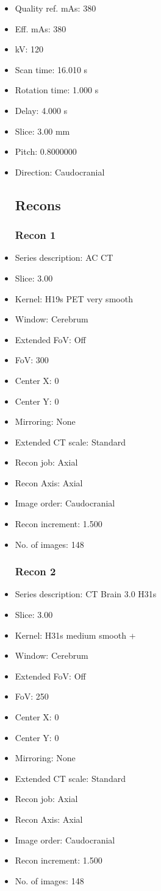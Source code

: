 \documentclass[12pt]{article}
\begin{document}
\begin{itemize}
\subsection{Scan}
\item Quality ref. mAs: 380\item Eff. mAs: 380\item kV: 120\item Scan time: 16.010 s\item Rotation time: 1.000 s\item Delay: 4.000 s\item Slice: 3.00 mm\item Pitch: 0.8000000\item Direction: Caudocranial\subsection{Recons}

\subsubsection{Recon 1}
\item Series description: AC CT
\item Slice: 3.00
\item Kernel: H19s PET very smooth
\item Window: Cerebrum
\item Extended FoV: Off
\item FoV: 300
\item Center X: 0
\item Center Y: 0
\item Mirroring: None
\item Extended CT scale: Standard
\item Recon job: Axial
\item Recon Axis: Axial
\item Image order: Caudocranial
\item Recon increment: 1.500
\item No. of images: 148
\subsubsection{Recon 2}
\item Series description: CT Brain 3.0 H31s
\item Slice: 3.00
\item Kernel: H31s medium smooth +
\item Window: Cerebrum
\item Extended FoV: Off
\item FoV: 250
\item Center X: 0
\item Center Y: 0
\item Mirroring: None
\item Extended CT scale: Standard
\item Recon job: Axial
\item Recon Axis: Axial
\item Image order: Caudocranial
\item Recon increment: 1.500
\item No. of images: 148

\end{itemize}
\end{document}
